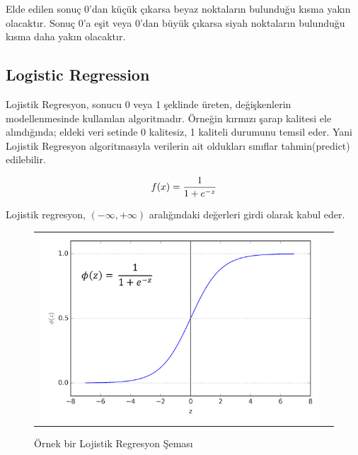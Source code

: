 \documentclass[conference]{IEEEtran}
\begin{document}
\quad Elde edilen sonuç 0’dan küçük çıkarsa beyaz noktaların bulunduğu kısma yakın olacaktır. Sonuç 0’a eşit veya 0’dan büyük çıkarsa siyah noktaların bulunduğu kısma daha yakın olacaktır\cite{12}.
\pagebreak
\subsection{\textbf{Logistic Regression}}

\quad Lojistik Regresyon, sonucu 0 veya 1 şeklinde üreten, değişkenlerin modellenmesinde kullanılan algoritmadır. Örneğin kırmızı şarap kalitesi ele alındığında; eldeki veri setinde 0 kalitesiz, 1 kaliteli durumunu temsil eder. Yani Lojistik Regresyon algoritmasıyla verilerin ait oldukları sınıflar tahmin(predict) edilebilir\cite{13}.

\begin{equation}
\label{eq:03}
\Large f(x)=\frac{1}{1+e^{-z}}
\end{equation}

Lojistik regresyon, $\left(-\infty,+\infty \right)$ aralığındaki değerleri girdi olarak kabul eder\cite{13}.

\begin{figure}[!h]
	\centering%
	\begin{center}
		\begin{tabular}{cc}%
			\includegraphics[scale=0.3]{pictures/pic_04.png}&%
		\end{tabular}%
	\end{center}
	\caption{Örnek bir Lojistik Regresyon Şeması\cite{13}}%
	\label{fig:04}
\end{figure}
\end{document}
